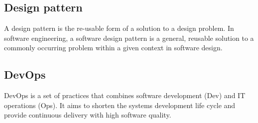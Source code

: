 \section{}





\subsection*{Design pattern}
A design pattern is the re-usable form of a solution to a design problem. In software engineering, a software design pattern is a general, reusable solution to a commonly occurring problem within a given context in software design.
\subsection*{DevOps}
DevOps is a set of practices that combines software development (Dev) and IT operations (Ops). It aims to shorten the systems development life cycle and provide continuous delivery with high software quality.
